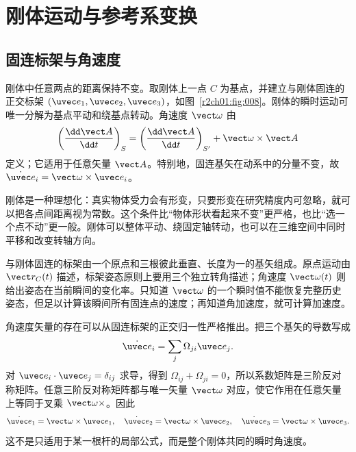 \section{刚体运动与参考系变换}
\label{r2ch01:sec:rigid}

\subsection{固连标架与角速度}

刚体中任意两点的距离保持不变。取刚体上一点 $C$ 为基点，并建立与刚体固连的正交标架 $(\uvec e_1,\uvec e_2,\uvec e_3)$，如图~\ref{r2ch01:fig:008}。刚体的瞬时运动可唯一分解为基点平动和绕基点转动。角速度 $\vect\omega$ 由
\begin{equation}
  \left(\frac{\dd\vect A}{\dd t}\right)_{S}
  =\left(\frac{\dd\vect A}{\dd t}\right)_{S'}
  +\vect\omega\times\vect A
  \label{r2ch01:eq:029}
\end{equation}
定义；它适用于任意矢量 $\vect A$。特别地，固连基矢在动系中的分量不变，故 $\dot{\uvec e}_i=\vect\omega\times\uvec e_i$。

刚体是一种理想化：真实物体受力会有形变，只要形变在研究精度内可忽略，就可以把各点间距离视为常数。这个条件比“物体形状看起来不变”更严格，也比“选一个点不动”更一般。刚体可以整体平动、绕固定轴转动，也可以在三维空间中同时平移和改变转轴方向。

与刚体固连的标架由一个原点和三根彼此垂直、长度为一的基矢组成。原点运动由 $\vect r_C(t)$ 描述，标架姿态原则上要用三个独立转角描述；角速度 $\vect\omega(t)$ 则给出姿态在当前瞬间的变化率。只知道 $\vect\omega$ 的一个瞬时值不能恢复完整历史姿态，但足以计算该瞬间所有固连点的速度；再知道角加速度，就可计算加速度。

角速度矢量的存在可以从固连标架的正交归一性严格推出。把三个基矢的导数写成
\[
  \dot{\uvec e}_i=\sum_j\Omega_{ji}\uvec e_j.
\]
对 $\uvec e_i\cdot\uvec e_j=\delta_{ij}$ 求导，得到
$\Omega_{ij}+\Omega_{ji}=0$，所以系数矩阵是三阶反对称矩阵。任意三阶反对称矩阵都与唯一矢量 $\vect\omega$ 对应，使它作用在任意矢量上等同于叉乘 $\vect\omega\times$。因此
\[
  \dot{\uvec e}_1=\vect\omega\times\uvec e_1,\quad
  \dot{\uvec e}_2=\vect\omega\times\uvec e_2,\quad
  \dot{\uvec e}_3=\vect\omega\times\uvec e_3.
\]
这不是只适用于某一根杆的局部公式，而是整个刚体共同的瞬时角速度。

